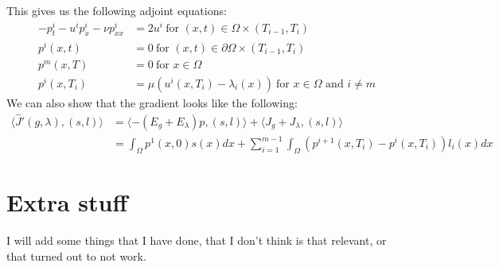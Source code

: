 \documentclass[11pt,a4paper]{article}
\begin{document}
This gives us the following adjoint equations:
\begin{align*}
-p_t^i -u^ip_x^i - \nu p_{xx}^i &= 2u^i \ \text{for $(x,t)\in \Omega\times(T_{i-1},T_i)$}\\
p^i(x,t) &= 0 \ \text{for $(x,t) \in\partial\Omega\times(T_{i-1},T_i)$ } \\
p^m(x,T) &= 0 \ \text{for $x \in\Omega$ } \\
p^i(x,T_i) &= \mu(u^i(x,T_i)-\lambda_i(x)) \ \text{for $x \in\Omega$ and $i\neq m$}
\end{align*}
We can also show that the gradient looks like the following:
\begin{align*}
\langle \hat{J}'(g,\lambda), (s,l)\rangle &=\langle -(E_g+E_{\lambda})p , (s,l)\rangle + \langle J_g+J_{\lambda}, (s,l)\rangle \\
&= \int_{\Omega} p^1(x,0)s(x)dx + \sum_{i=1}^{m-1}\int_{\Omega} (p^{i+1}(x,T_i)-p^i(x,T_i))l_i(x)dx
\end{align*}
\section{Extra stuff}
I will add some things that I have done, that I don't think is that relevant, or that turned out to not work.
\end{document}
